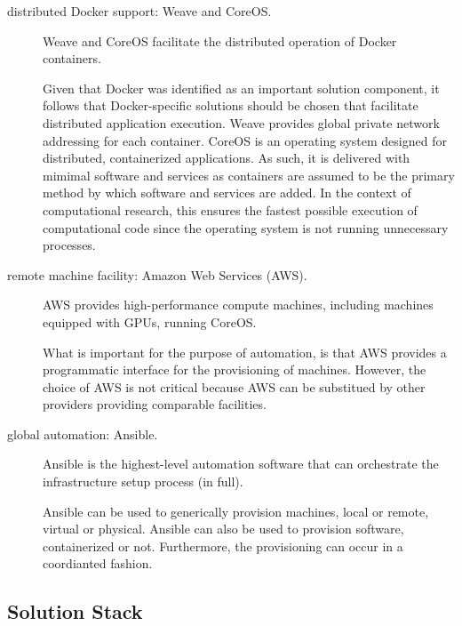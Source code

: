 \begin{description}
\item[distributed \textsf{Docker} support: \textsf{Weave} and \textsf{CoreOS}.]
%
\textsf{Weave} and \textsf{CoreOS} facilitate the distributed operation of \textsf{Docker} containers.

Given that \textsf{Docker} was identified as an important solution component, it follows that \textsf{Docker}-specific solutions should be chosen that facilitate distributed application execution.
%
\textsf{Weave} provides global private network addressing for each container.
%
\textsf{CoreOS} is an operating system designed for distributed, containerized applications.
%
As such, it is delivered with mimimal software and services as containers are assumed to be the primary method by which software and services are added.
%
In the context of computational research, this ensures the fastest possible execution of computational code since the operating system is not running unnecessary processes.

\item[remote machine facility: \textsf{Amazon Web Services (AWS)}.] 
  \textsf{AWS} provides high-performance compute machines, including machines equipped with GPUs, running \textsf{CoreOS}.
  

  What is important for the purpose of automation, is that \textsf{AWS} provides a programmatic interface for the provisioning of machines.
  However, the choice of \textsf{AWS} is not critical because \textsf{AWS} can be substitued by other providers providing comparable facilities.
 


\item[global automation: \textsf{Ansible}.]
  \textsf{Ansible} is the highest-level automation software that can orchestrate the infrastructure setup process (in full).
  
  \textsf{Ansible} can be used to generically provision machines, local or remote, virtual or physical.
  \textsf{Ansible} can also be used to provision software, containerized or not.
  Furthermore, the provisioning can occur in a coordianted fashion.


\end{description}


\subsection{Solution Stack}

